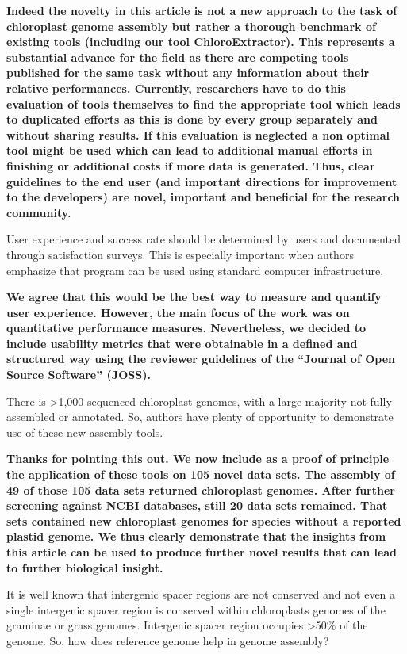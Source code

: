 \documentclass[a4paper,10pt]{scrartcl}
\begin{document}
\textbf{
Indeed the novelty in this article is not a new approach to the task of chloroplast genome assembly but rather a thorough benchmark of existing tools (including our tool ChloroExtractor).
This represents a substantial advance for the field as there are competing tools published for the same task without any information about their relative performances.
Currently, researchers have to do this evaluation of tools themselves to find the appropriate tool which leads to duplicated efforts as this is done by every group separately and without sharing results.
If this evaluation is neglected a non optimal tool might be used which can lead to additional manual efforts in finishing or additional costs if more data is generated.
Thus, clear guidelines to the end user (and important directions for improvement to the developers) are novel, important and beneficial for the research community.
}

User experience and success rate should be determined by users and documented through satisfaction surveys.
This is especially important when authors emphasize that program can be used using standard computer infrastructure.

\textbf{
We agree that this would be the best way to measure and quantify user experience.
However, the main focus of the work was on quantitative performance measures. 
Nevertheless, we decided to include usability metrics that were obtainable in a defined and structured way using the reviewer guidelines of the ``Journal of Open Source Software'' (JOSS).
}

There is >1,000 sequenced chloroplast genomes, with a large majority not fully assembled or annotated.
So, authors have plenty of opportunity to demonstrate use of these new assembly tools.

\textbf{
Thanks for pointing this out.
We now include as a proof of principle the application of these tools on 105 novel data sets.
The assembly of 49 of those 105 data sets returned chloroplast genomes.
After further screening against NCBI databases, still 20 data sets remained.
That sets contained new chloroplast genomes for species without a reported plastid genome.
We thus clearly demonstrate that the insights from this article can be used to produce further novel results that can lead to further biological insight.
}

It is well known that intergenic spacer regions are not conserved and not even a single intergenic spacer region is conserved within chloroplasts genomes of the graminae or grass genomes.
Intergenic spacer region occupies >50\% of the genome.
So, how does reference genome help in genome assembly?
\end{document}
